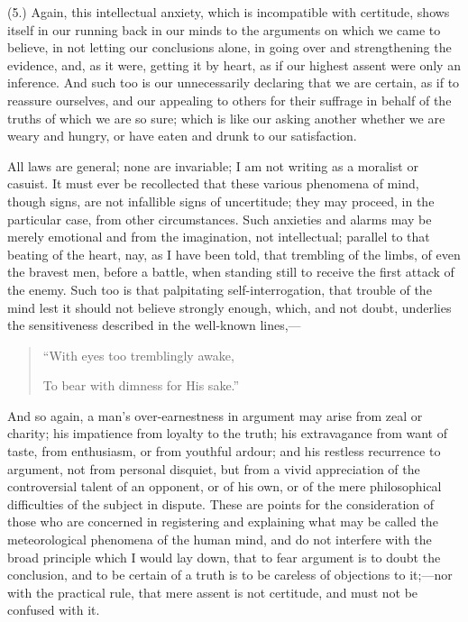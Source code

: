 (5.) Again, this intellectual anxiety, which is incompatible with
certitude, shows itself in our running back in our minds to the
arguments on which we came to believe, in not letting our conclusions
alone, in going over and strengthening the evidence, and, as it were,
getting it by heart, as if our highest assent were only an inference.
And such too is our unnecessarily declaring that we are certain, as if
to reassure ourselves, and our appealing to others for their suffrage
in behalf of the truths of which we are so sure; which is like our
asking another whether we are weary and hungry, or have eaten and
drunk to our satisfaction.

All laws are general; none are invariable; I am not writing as a
moralist or casuist. It must ever be recollected that these various
phenomena of mind, though signs, are not infallible signs of
uncertitude; they may proceed, in the particular case, from other
circumstances. Such anxieties and alarms may be merely emotional and
from the imagination, not intellectual; parallel to that beating
of the heart, nay, as I have been told, that trembling of the limbs,
of even the bravest men, before a battle, when standing still to
receive the first attack of the enemy. Such too is that palpitating
self-interrogation, that trouble of the mind lest it should not
believe strongly enough, which, and not doubt, underlies the
sensitiveness described in the well-known lines,—

\begin{quote}

``With eyes too tremblingly awake,

To bear with dimness for His sake.''

\end{quote}

And so again, a man's over-earnestness in argument may arise from
zeal or charity; his impatience from loyalty to the truth; his
extravagance from want of taste, from enthusiasm, or from youthful
ardour; and his restless recurrence to argument, not from personal
disquiet, but from a vivid appreciation of the controversial talent of
an opponent, or of his own, or of the mere philosophical difficulties
of the subject in dispute. These are points for the consideration of
those who are concerned in registering and explaining what may be
called the meteorological phenomena of the human mind, and do not
interfere with the broad principle which I would lay down, that to
fear argument is to doubt the conclusion, and to be certain of a truth
is to be careless of objections to it;—nor with the practical rule,
that mere assent is not certitude, and must not be confused with it.

